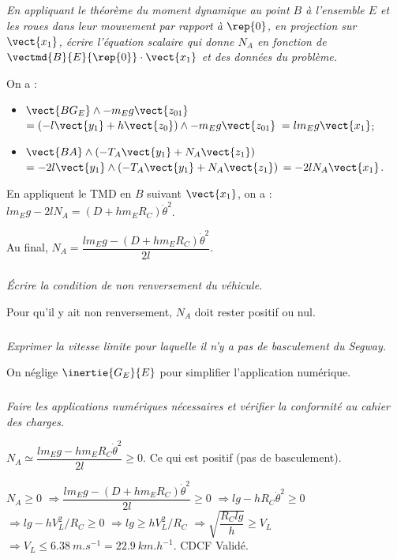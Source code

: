 \begin{multicols}{2}
\begin{corrige}
\end{corrige}
\else
\fi


\ifnormal
\subparagraph{}\textit{En appliquant le théorème du moment dynamique au point $B$ à l'ensemble $E$ et les roues dans leur mouvement par rapport à $\rep{0}$, en projection sur $\vect{x_1}$, écrire l’équation scalaire qui donne $N_A$ en fonction de $\vectmd{B}{E}{\rep{0}}\cdot \vect{x_1}$ et des données du problème.}
\else
\fi
\ifprof
\begin{corrige}
On a : 
\begin{itemize}
\item $\vect{BG_E}\wedge - m_E g \vect{z_{01}}$ 
$=\left(-l\vect{y_1}+h\vect{z_0} \right) \wedge - m_E g \vect{z_{01}}$
$=l  m_E g \vect{x_{1}}$;
\item $\vect{BA}\wedge \left(-T_A\vect{y_1}+N_A\vect{z_1} \right)$ 
$=-2l\vect{y_1}\wedge \left(-T_A\vect{y_1}+N_A\vect{z_1} \right)$
$=-2l N_A\vect{x_1} $.
\end{itemize}
En appliquent le TMD en $B$ suivant $\vect{x_1}$, on a : $l  m_E g -2l N_A=\left(D+ h m_E R_C\right)\dot{\theta}^2$. 

Au final,  $ N_A=\dfrac{ l  m_E g-\left(D+ h m_E R_C\right)\dot{\theta}^2}{2l}$. 
\end{corrige}
\else
\fi

\ifnormal
\subparagraph{}\textit{Écrire la condition de non renversement du véhicule.}
\else
\fi

\ifprof
\begin{corrige}
Pour qu'il y ait non renversement, $N_A$ doit rester positif ou nul. 
\end{corrige}
\else
\fi

\iftdifficile
\subparagraph{}\textit{Exprimer la vitesse limite pour laquelle il n'y a pas de basculement du Segway.}

\else
\fi


On néglige $\inertie{G_E}{E}$ pour simplifier l’application numérique.

\subparagraph{}\textit{Faire les applications numériques nécessaires et vérifier la conformité au cahier des charges.}
\ifprof
\begin{corrige}
$ N_A\simeq\dfrac{l  m_E g-h m_E R_C\dot{\theta}^2 }{2l} \geq 0$.%
Ce qui est positif (pas de basculement). 

$N_A\geq0$ $\Rightarrow  \dfrac{ l  m_E g-\left(D+ h m_E R_C\right)\dot{\theta}^2}{2l}\geq0$
$\Rightarrow  l  g- h  R_C\dot{\theta}^2\geq0$
$\Rightarrow  l  g- h  V_L^2/R_C\geq0$
$\Rightarrow  l  g \geq h  V_L^2/R_C$
$\Rightarrow   \sqrt{\dfrac{R_C l  g}{h}} \geq   V_L$
$\Rightarrow     V_L  \leq \SI{6,38}{m.s^{-1}}=\SI{22,9}{km.h^{-1}}$. 
CDCF Validé.
\end{corrige}
\else
\fi


\end{multicols}
